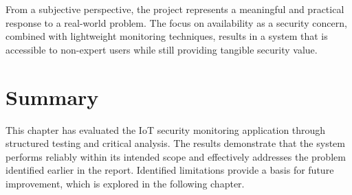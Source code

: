 From a subjective perspective, the project represents a meaningful and practical response to a real-world problem. The focus on availability as a security concern, combined with lightweight monitoring techniques, results in a system that is accessible to non-expert users while still providing tangible security value.

\section{Summary}

This chapter has evaluated the IoT security monitoring application through structured testing and critical analysis. The results demonstrate that the system performs reliably within its intended scope and effectively addresses the problem identified earlier in the report. Identified limitations provide a basis for future improvement, which is explored in the following chapter.
